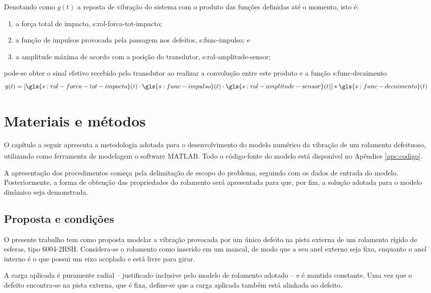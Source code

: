 \documentclass[12pt,oneside,english,brazil,lmodern,siglas,simbolos,cite=num]{ucsmonograph}
\begin{document}
	Denotando como $ g(t) $ a reposta de vibração do sistema com o produto das funções definidas até o momento, isto é:
	\begin{enumerate}
		\item a força total de impacto, \gls{s:rol-forca-tot-impacto};
		\item a função de impulsos provocada pela passagem nos defeitos, \gls{s:func-impulso}; e
		\item a amplitude máxima de acordo com a posição do transdutor, \gls{s:rol-amplitude-sensor};
	\end{enumerate}
	pode-se obter o sinal efetivo recebido pelo transdutor ao realizar a convolução entre este produto e a função \gls{s:func-decaimento} \cite{mcfadden:1984,cong:2013}
	\begin{equation}
		g(t) = [\gls{s:rol-forca-tot-impacto}(t)\cdot \gls{s:func-impulso}(t)\cdot \gls{s:rol-amplitude-sensor}(t)]\ast\gls{s:func-decaimento}(t)
	\end{equation}
	
	\chapter{Materiais e métodos}
	O capítulo a seguir apresenta a metodologia adotada para o desenvolvimento do modelo numérico da vibração de um rolamento defeituoso, utilizando como ferramenta de modelagem o \foreignlanguage{english}{software} MATLAB\textsuperscript\textregistered.
	Todo o código-fonte do modelo está disponível no Apêndice \ref{apc:codigo}.
	
	A apresentação dos procedimentos começa pela delimitação de escopo do problema, seguindo com os dados de entrada do modelo.
	Posteriormente, a forma de obtenção das propriedades do rolamento será apresentada para que, por fim, a solução adotada para o modelo dinâmico seja demonstrada.
	
	\section{Proposta e condições} \label{sec:proposta-condicoes}
	O presente trabalho tem como proposta modelar a vibração provocada por um único defeito na pista externa de um rolamento rígido de esferas, tipo 6004-2RSH.
	Considera-se o rolamento como inserido em um mancal, de modo que a seu anel externo seja fixo, enquanto o anel interno é o que possui um eixo acoplado e está livre para girar.
	
	A carga aplicada é puramente radial -- justificado inclusive pelo modelo de rolamento adotado -- e é mantida constante.
	Uma vez que o defeito encontra-se na pista externa, que é fixa, define-se que a carga aplicada também está alinhada ao defeito.
	
\end{document}
